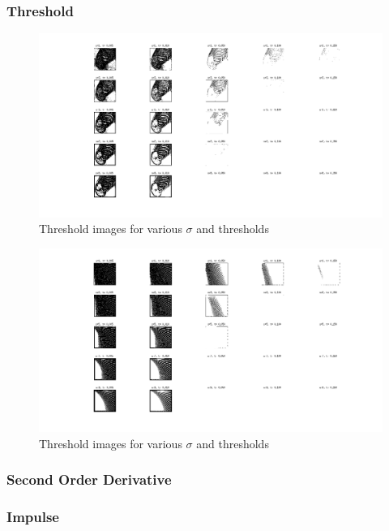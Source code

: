 \documentclass[a4paper,10pt]{article}
\begin{document}
\subsubsection{Threshold}
\begin{figure}[ht]
\centering
\includegraphics[width=\textwidth]{zebra_img/threshold}
\caption{Threshold images for various $\sigma$ and thresholds}
\label{fig:zebrathresh}
\end{figure}
\begin{figure}[ht]
\centering
\includegraphics[width=\textwidth]{pn1_img/threshold}
\caption{Threshold images for various $\sigma$ and thresholds}
\label{fig:pn1thresh}
\end{figure}

\subsubsection{Second Order Derivative}



\subsubsection{Impulse}
\end{document}
